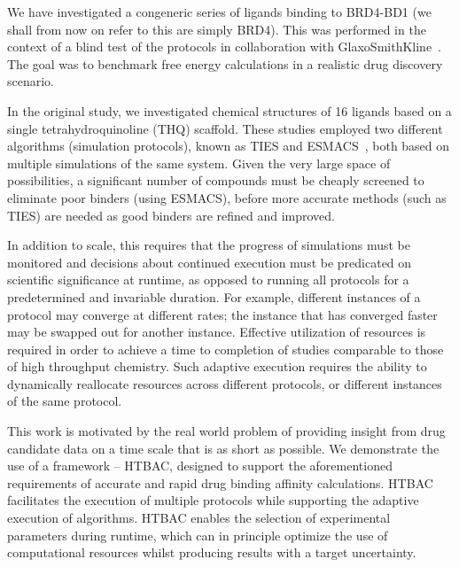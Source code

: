 \documentclass[conference]{IEEEtran}
\begin{document}
We have investigated a congeneric series of ligands binding to BRD4-BD1 (we shall
from now on refer to this are simply BRD4). This was performed in the context
of a blind test of the protocols in collaboration with
GlaxoSmithKline~\cite{Wan2017brd4}. The goal was to benchmark free energy 
calculations in a realistic drug discovery scenario. 

In the original study, we investigated chemical structures of 16 ligands based
on a single tetrahydroquinoline (THQ) scaffold. These studies employed two
different algorithms (simulation protocols), known as TIES and
ESMACS~\cite{Bhati2017}, both based on multiple simulations of the same
system. Given the very large space of possibilities, a significant number of
compounds must be cheaply screened to eliminate poor binders (using ESMACS),
before more accurate methods (such as TIES) are needed as good binders are
refined and improved.

In addition to scale, this requires that the progress of simulations must be
monitored and decisions about continued execution must be predicated on
scientific significance at runtime, as opposed to running all protocols for a
predetermined and invariable duration. For example, different instances of a
protocol may converge at different rates; the instance that has converged
faster may be swapped out for another instance. Effective utilization of
resources is required in order to achieve a time to completion of studies
comparable to those of high throughput chemistry. Such adaptive execution
requires the ability to dynamically reallocate resources across different
protocols, or different instances of the same protocol.



This work is motivated by the real world problem of providing insight from
drug candidate data on a time scale that is as short as possible. We
demonstrate the use of a framework -- HTBAC, designed to support the
aforementioned requirements of accurate and rapid drug binding affinity
calculations. HTBAC facilitates the execution of multiple protocols
 while supporting the adaptive execution of
algorithms.  HTBAC enables the selection of experimental
parameters during runtime, which can in principle optimize the use of
computational resources whilst producing results with a target uncertainty.
\end{document}
